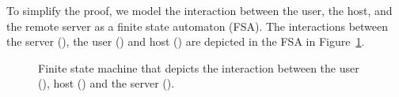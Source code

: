 

To simplify the proof, we model the interaction between the user, the host, and the remote server as a finite state automaton (FSA).
The interactions between the server (\server), the user (\user) and host (\host) are depicted in the FSA in Figure~\ref{fig:fsm}.

\begin{figure}[h!]
\begin{center}
\end{center}
\caption[\name protocol FSM]{Finite state machine that depicts the interaction between the user (\user), host (\host) and the server (\server).}
\label{fig:fsm}
\end{figure}



